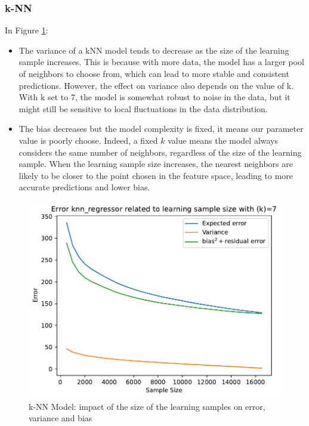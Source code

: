 \documentclass[12pt,titlepage]{article}
\begin{document}
\subsubsection{k-NN}
In Figure \ref{fig:ls_knn}:
\begin{itemize}
    \item 
    The variance of a kNN model tends to decrease as the size of the learning sample increases. This is because with more data, the model has a larger pool of neighbors to choose from, which can lead to more stable and consistent predictions. However, the effect on variance also depends on the value of k. With k set to 7, the model is somewhat robust to noise in the data, but it might still be sensitive to local fluctuations in the data distribution.

    \vspace{0.3cm}

    \item 
     The bias decreases but the model complexity is fixed, it means our parameter value is poorly choose. Indeed, a fixed $k$ value means the model always considers the same number of neighbors, regardless of the size of the learning sample. When the learning sample size increases, the nearest neighbors are likely to be closer to the point chosen in the feature space, leading to more accurate predictions and lower bias.
    
\end{itemize}

\begin{figure}[H]
    \centering
    \includegraphics[scale = 0.6]{image/2.4_knn_regressor_7-500-17000-500.pdf}
    \caption{k-NN Model: impact of the size of the learning samples on error, variance and bias}
    \label{fig:ls_knn}
\end{figure}
\end{document}
